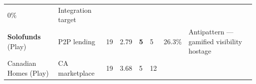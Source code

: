 \documentclass[
  10pt,
]{article}
\begin{document}
\begin{longtable}[]{@{}llllllll@{}}
\begin{minipage}[t]{0.10\columnwidth}
0\%\strut
\end{minipage} & \begin{minipage}[t]{0.10\columnwidth}\raggedright
Integration target\strut
\end{minipage}\tabularnewline
\begin{minipage}[t]{0.10\columnwidth}\raggedright
\textbf{Solofunds} (Play)\strut
\end{minipage} & \begin{minipage}[t]{0.10\columnwidth}\raggedright
P2P lending\strut
\end{minipage} & \begin{minipage}[t]{0.10\columnwidth}\raggedright
19\strut
\end{minipage} & \begin{minipage}[t]{0.10\columnwidth}\raggedright
2.79\strut
\end{minipage} & \begin{minipage}[t]{0.10\columnwidth}\raggedright
\textbf{5}\strut
\end{minipage} & \begin{minipage}[t]{0.10\columnwidth}\raggedright
5\strut
\end{minipage} & \begin{minipage}[t]{0.10\columnwidth}\raggedright
26.3\%\strut
\end{minipage} & \begin{minipage}[t]{0.10\columnwidth}\raggedright
Antipattern --- gamified visibility hostage\strut
\end{minipage}\tabularnewline
\begin{minipage}[t]{0.10\columnwidth}\raggedright
Canadian Homes (Play)\strut
\end{minipage} & \begin{minipage}[t]{0.10\columnwidth}\raggedright
CA marketplace\strut
\end{minipage} & \begin{minipage}[t]{0.10\columnwidth}\raggedright
19\strut
\end{minipage} & \begin{minipage}[t]{0.10\columnwidth}\raggedright
3.68\strut
\end{minipage} & \begin{minipage}[t]{0.10\columnwidth}\raggedright
5\strut
\end{minipage} & \begin{minipage}[t]{0.10\columnwidth}\raggedright
12\strut
\end{minipage} & \begin{minipage}[t]{0.10\columnwidth}\raggedright

\end{minipage}
\end{longtable}
\end{document}
